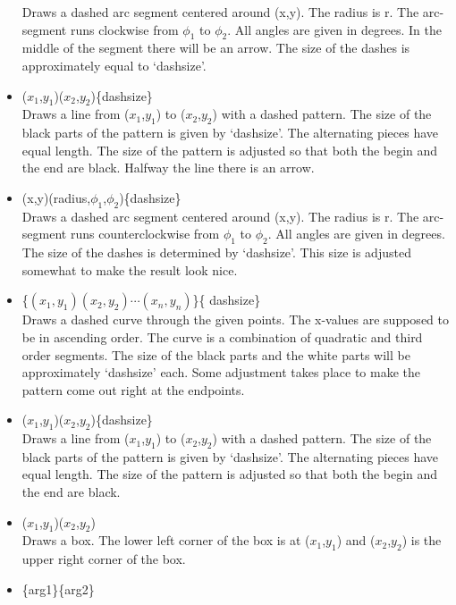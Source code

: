 \begin{itemize}
    Draws a dashed arc segment centered around (x,y). The radius is r. The 
    arc-segment runs clockwise from $\phi_1$ to $\phi_2$. All 
    angles are given in degrees. In the middle of the segment there will 
    be an arrow. The size of the dashes is approximately equal to 
    `dashsize'.
\item {}($x_1$,$y_1$)($x_2$,$y_2$)\{dashsize\} \hfill \\
    Draws a line from ($x_1$,$y_1$) to ($x_2$,$y_2$) with a dashed 
    pattern. The size of the black parts of the pattern is given by 
    `dashsize'. The alternating pieces have equal length. The size of 
    the pattern is adjusted so that both the begin and the end are 
    black. Halfway the line there is an arrow.
\item {}(x,y)(radius,$\phi_1$,$\phi_2$)\{dashsize\} \hfill \\
    Draws a dashed arc segment centered around (x,y). The radius is r. The 
    arc-segment runs counterclockwise from $\phi_1$ to $\phi_2$. All 
    angles are given in degrees. The size of the dashes is determined by 
    `dashsize'. This size is adjusted somewhat to make the result look 
    nice.
\item {}\{$(x_1,y_1)(x_2,y_2)\cdots(x_n,y_n)$\}\{
    dashsize\} \hfill \\
    Draws a dashed curve through the given points. The x-values are 
    supposed to be in ascending order. The curve is a combination of 
    quadratic and third order segments. The size of the black parts and 
    the white parts will be approximately `dashsize' each. Some 
    adjustment takes place to make the pattern come out right at the 
    endpoints.
\item {}($x_1$,$y_1$)($x_2$,$y_2$)\{dashsize\} \hfill \\
    Draws a line from ($x_1$,$y_1$) to ($x_2$,$y_2$) with a dashed 
    pattern. The size of the black parts of the pattern is given by 
    `dashsize'. The alternating pieces have equal length. The size of 
    the pattern is adjusted so that both the begin and the end are 
    black.
\item {}($x_1$,$y_1$)($x_2$,$y_2$) \hfill \\
    Draws a box. The lower left corner of the box is at ($x_1$,$y_1$) and 
    ($x_2$,$y_2$) is the upper right corner of the box.
\item {}\{arg1\}\{arg2\} \hfill \\

\end{itemize}
